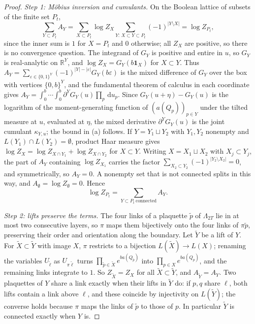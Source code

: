 \documentclass[11pt,a4paper]{amsart}
\theoremstyle{definition}
\theoremstyle{remark}
\numberwithin{equation}{section}
\newcommand{\R}{\mathbb{R}}          %
\newcommand{\abs}[1]{\lvert #1\rvert}      %
\newcommand{\dd}{\,\mathrm{d}}             %
\begin{document}
\begin{proof}
\emph{Step 1: M\"obius inversion and cumulants.} On the Boolean lattice of subsets of the finite set $P_t$,
\[
\sum_{Y\subset P_t}A_Y=\sum_{X\subset P_t}\log Z_X\sum_{Y:\,X\subset Y\subset P_t}(-1)^{\abs{Y\setminus X}}=\log Z_{P_t},
\]
since the inner sum is $1$ for $X=P_t$ and $0$ otherwise; all $Z_X$ are positive, so there is no convergence question. The integrand of $G_Y$ is positive and entire in $u$, so $G_Y$ is real-analytic on $\R^Y$, and $\log Z_X=G_Y(b\mathbf 1_X)$ for $X\subset Y$. Thus $A_Y=\sum_{\varepsilon\in\{0,1\}^Y}(-1)^{\abs{Y}-\abs{\varepsilon}}G_Y(b\varepsilon)$ is the mixed difference of $G_Y$ over the box with vertices $\{0,b\}^Y$, and the fundamental theorem of calculus in each coordinate gives $A_Y=\int_0^b\cdots\int_0^b\partial^YG_Y(u)\prod_p\dd u_p$. Since $G_Y(u+\eta)-G_Y(u)$ is the logarithm of the moment-generating function of $(a(Q_p))_{p\in Y}$ under the tilted measure at $u$, evaluated at $\eta$, the mixed derivative $\partial^YG_Y(u)$ is the joint cumulant $\kappa_{Y,u}$; the bound in (a) follows. If $Y=Y_1\sqcup Y_2$ with $Y_1,Y_2$ nonempty and $L(Y_1)\cap L(Y_2)=\emptyset$, product Haar measure gives $\log Z_X=\log Z_{X\cap Y_1}+\log Z_{X\cap Y_2}$ for $X\subset Y$. Writing $X=X_1\sqcup X_2$ with $X_j\subset Y_j$, the part of $A_Y$ containing $\log Z_{X_1}$ carries the factor $\sum_{X_2\subset Y_2}(-1)^{\abs{Y_2\setminus X_2}}=0$, and symmetrically, so $A_Y=0$. A nonempty set that is not connected splits in this way, and $A_\emptyset=\log Z_\emptyset=0$. Hence
\begin{equation}\label{eq:winding-mobius}
\log Z_{P_t}=\sum_{Y\subset P_t\ \text{connected}}A_Y .
\end{equation}

\emph{Step 2: lifts preserve the terms.} The four links of a plaquette $\tilde p$ of $\Lambda_{2T}$ lie in at most two consecutive layers, so $\pi$ maps them bijectively onto the four links of $\pi\tilde p$, preserving their order and orientation along the boundary. Let $\tilde Y$ be a lift of $Y$. For $\tilde X\subset\tilde Y$ with image $X$, $\pi$ restricts to a bijection $L(\tilde X)\to L(X)$; renaming the variables $U_{\tilde\ell}$ as $U_{\pi\tilde\ell}$ turns $\prod_{\tilde p\in\tilde X}e^{ba(Q_{\tilde p})}$ into $\prod_{p\in X}e^{ba(Q_p)}$, and the remaining links integrate to $1$. So $Z_{\tilde X}=Z_X$ for all $\tilde X\subset\tilde Y$, and $A_{\tilde Y}=A_Y$. Two plaquettes of $Y$ share a link exactly when their lifts in $\tilde Y$ do: if $p,q$ share $\ell$, both lifts contain a link above $\ell$, and these coincide by injectivity on $L(\tilde Y)$; the converse holds because $\pi$ maps the links of $\tilde p$ to those of $p$. In particular $\tilde Y$ is connected exactly when $Y$ is.


\end{proof}
\end{document}
